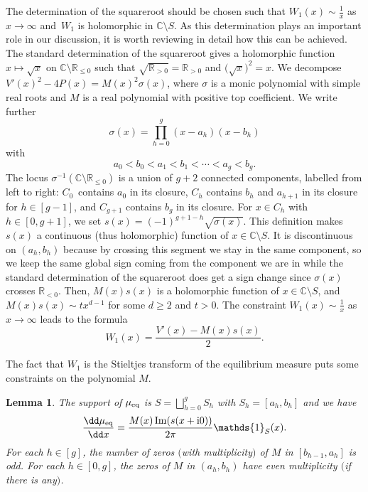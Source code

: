 \documentclass[pdftex]{sigma}
\numberwithin{equation}{section}
\newtheorem{Lemma}[Theorem]{Lemma}
\newcommand{\ind}{\mathds{1}}
\begin{document}
The determination of the squareroot should be chosen such that $W_1(x) \sim \frac{1}{x}$ as $x \rightarrow \infty$ and~$W_1$ is holomorphic in $\mathbb{C} \setminus S$. As this determination plays an important role in our discussion, it is worth reviewing in detail how this can be achieved. The standard determination of the squareroot gives a holomorphic function $x \mapsto \sqrt{x}$ on $\mathbb{C} \setminus \mathbb{R}_{\leq 0}$ such that $\sqrt{\mathbb{R}_{> 0}} = \mathbb{R}_{> 0}$ and $\bigl(\sqrt{x}\bigr)^2 = x$. We decompose $V'(x)^2 - 4P(x) = M(x)^2 \sigma(x)$, where $\sigma$ is a monic polynomial with simple real roots and $M$ is a real polynomial with positive top coefficient. We write further
\[
\sigma(x) = \prod_{h = 0}^{g} (x - a_h)(x - b_h)
\]
with
\[
a_0 < b_0 < a_1 < b_1 < \cdots < a_g < b_g.
\]
The locus
$\sigma^{-1}(\mathbb{C} \setminus \mathbb{R}_{\leq 0})$ is a union of
$g + 2$ connected components, labelled from left to right: $C_0$~contains $a_0$ in its closure, $C_h$ contains $b_{h}$
and $a_{h + 1}$ in its closure for $h \in [g - 1]$, and $C_{g + 1}$
contains $b_g$ in its closure. For $x \in C_{h}$ with $h \in [0,g+1]$, we set $s(x) = (-1)^{g + 1 -h}\sqrt{\sigma(x)}$. This
definition makes $s(x)$ a continuous (thus holomorphic) function of
$x \in \mathbb{C} \setminus S$. It is discontinuous on $(a_h,b_h)$ because by
crossing this segment we stay in the same component, so
we keep the same global sign coming from the component we are in
while the standard determination of the squareroot does get a sign
change since $\sigma(x)$ crosses $\mathbb{R}_{< 0}$. Then, $M(x)s(x)$ is a holomorphic function of $x \in \mathbb{C}\setminus S$, and $M(x)s(x) \sim t x^{d - 1}$ for some $d \geq 2$ and $t > 0$. The constraint $W_1(x) \sim \frac{1}{x}$ as $x \rightarrow \infty$ leads to the formula
\begin{equation}
\label{W1SM}W_1(x) = \frac{V'(x) - M(x)s(x)}{2}.
\end{equation}

The fact that $W_1$ is the Stieltjes transform of the equilibrium measure puts some constraints on the polynomial $M$.

\begin{Lemma}
\label{lemMmm} The support of $\mu_{{\rm eq}}$ is $S = \bigsqcup_{h = 0}^{g} S_h$ with $S_h = [a_h,b_h]$ and we have
\[
\frac{\dd \mu_{{\rm eq}}}{\dd x} = \frac{M(x)  \operatorname{Im}(s(x + {\rm i}0))}{2\pi} \ind_S(x).
\]
For each $h \in [g]$, the number of zeros $($with multiplicity$)$ of $M$ in $[b_{h - 1},a_h]$ is odd. For each $h \in [0,g]$, the zeros of $M$ in $(a_h,b_h)$ have even multiplicity $($if there is any$)$.
\end{Lemma}
\end{document}
